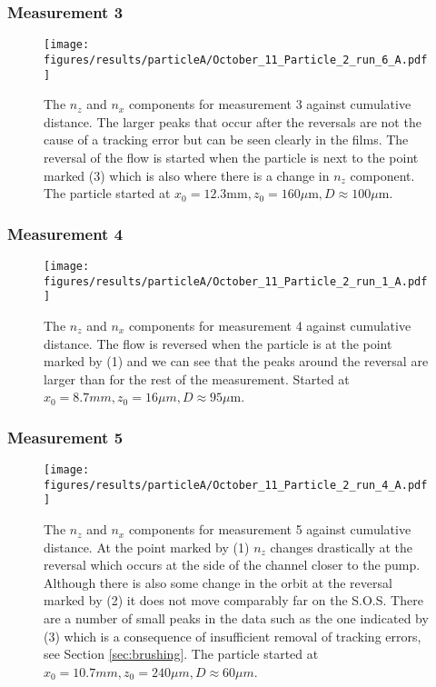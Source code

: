 \subsubsection{Measurement 3}
\begin{figure}[H]
\begin{center}
\texttt{[image: figures/results/particleA/October\_11\_Particle\_2\_run\_6\_A.pdf]}
\end{center}
\caption{The $n_z$ and $n_x$ components for measurement 3 against cumulative distance. The larger peaks that occur after the reversals are not the cause of a tracking error but can be seen clearly in the films. The reversal of the flow is started when the particle is next to the point marked (3) which is also where there is a change in $n_z$ component. The particle started at $ x_0 = 12.3 \text{mm}, z_0 = 160 \mu\text{m}, D \approx 100\mu$m.}
\label{fig:particleA3}
\end{figure}



\subsubsection{Measurement 4}
\begin{figure}[H]
\begin{center}
\texttt{[image: figures/results/particleA/October\_11\_Particle\_2\_run\_1\_A.pdf]}
\end{center}
\caption{The $n_z$ and $n_x$ components for measurement 4 against cumulative distance. The flow is reversed when the particle is at the point marked by (1) and we can see that the peaks around the reversal are larger than for the rest of the measurement. Started at $x_0 = 8.7 mm, z_0 = 16\mu m, D \approx 95\mu$m.}
\label{fig:particleA4}
\end{figure}

\subsubsection{Measurement 5}
\begin{figure}[H]
\centering
\texttt{[image: figures/results/particleA/October\_11\_Particle\_2\_run\_4\_A.pdf]}
\caption{The $n_z$ and $n_x$ components for measurement 5 against cumulative distance. At the point marked by (1) $n_z$ changes drastically at the reversal which occurs at the side of the channel closer to the pump. Although there is also some change in the orbit at the reversal marked by (2) it does not move comparably far on the S.O.S. There are a number of small peaks in the data such as the one indicated by (3) which is a consequence of insufficient removal of tracking errors, see Section \ref{sec:brushing}. The particle started at $x_0 = 10.7 mm, z_0 = 240 \mu m, D \approx 60\mu m$.}
\label{fig:particleA5}
\end{figure}

